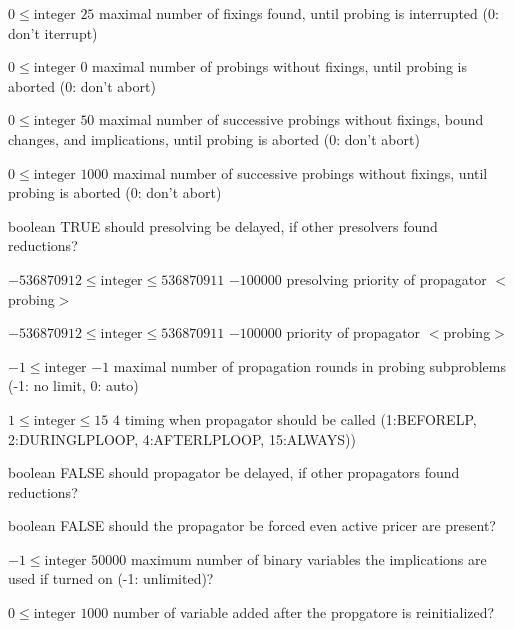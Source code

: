 %
{$0\leq\textrm{integer}$}%
{$25$}%
{maximal number of fixings found, until probing is interrupted (0: don't iterrupt)}%
{}

%
{$0\leq\textrm{integer}$}%
{$0$}%
{maximal number of probings without fixings, until probing is aborted (0: don't abort)}%
{}

%
{$0\leq\textrm{integer}$}%
{$50$}%
{maximal number of successive probings without fixings, bound changes, and implications, until probing is aborted (0: don't abort)}%
{}

%
{$0\leq\textrm{integer}$}%
{$1000$}%
{maximal number of successive probings without fixings, until probing is aborted (0: don't abort)}%
{}

%
{boolean}%
{TRUE}%
{should presolving be delayed, if other presolvers found reductions?}%
{}

%
{$-536870912\leq\textrm{integer}\leq536870911$}%
{$-100000$}%
{presolving priority of propagator $<$probing$>$}%
{}

%
{$-536870912\leq\textrm{integer}\leq536870911$}%
{$-100000$}%
{priority of propagator $<$probing$>$}%
{}

%
{$-1\leq\textrm{integer}$}%
{$-1$}%
{maximal number of propagation rounds in probing subproblems (-1: no limit, 0: auto)}%
{}

%
{$1\leq\textrm{integer}\leq15$}%
{$4$}%
{timing when propagator should be called (1:BEFORELP, 2:DURINGLPLOOP, 4:AFTERLPLOOP, 15:ALWAYS))}%
{}

%
{boolean}%
{FALSE}%
{should propagator be delayed, if other propagators found reductions?}%
{}

%
{boolean}%
{FALSE}%
{should the propagator be forced even active pricer are present?}%
{}

%
{$-1\leq\textrm{integer}$}%
{$50000$}%
{maximum number of binary variables the implications are used if turned on (-1: unlimited)?}%
{}

%
{$0\leq\textrm{integer}$}%
{$1000$}%
{number of variable added after the propgatore is reinitialized?}%
{}

